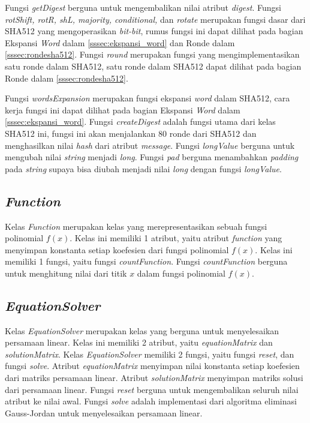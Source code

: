 Fungsi \textit{getDigest} berguna untuk mengembalikan nilai atribut \textit{digest}. Fungsi \textit{rotShift, rotR, shL, majority, conditional,} dan \textit{rotate} merupakan fungsi dasar dari SHA512 yang mengoperasikan \textit{bit-bit}, rumus fungsi ini dapat dilihat pada bagian Ekspansi \textit{Word} dalam \ref{sssec:ekspansi_word} dan Ronde dalam \ref{sssec:rondesha512}. Fungsi \textit{round} merupakan fungsi yang mengimplementasikan satu ronde dalam SHA512, satu ronde dalam SHA512 dapat dilihat pada bagian Ronde dalam \ref{sssec:rondesha512}.

Fungsi \textit{wordsExpansion} merupakan fungsi ekspansi \textit{word} dalam SHA512, cara kerja fungsi ini dapat dilihat pada bagian Ekspansi \textit{Word} dalam \ref{sssec:ekspansi_word}. Fungsi \textit{createDigest} adalah fungsi utama dari kelas SHA512 ini, fungsi ini akan menjalankan 80 ronde dari SHA512 dan menghasilkan nilai \textit{hash} dari atribut \textit{message}. Fungsi \textit{longValue} berguna untuk mengubah nilai \textit{string} menjadi \textit{long}. Fungsi \textit{pad} berguna menambahkan \textit{padding} pada \textit{string} supaya bisa diubah menjadi nilai \textit{long} dengan fungsi \textit{longValue}.

\subsection{\textit{Function}}

Kelas \textit{Function} merupakan kelas yang merepresentasikan sebuah fungsi polinomial \begin{math}f(x)\end{math}. Kelas ini memiliki 1 atribut, yaitu atribut \textit{function} yang menyimpan konstanta setiap koefesien dari fungsi polinomial \begin{math}f(x)\end{math}. Kelas ini memiliki 1 fungsi, yaitu fungsi \textit{countFunction}. Fungsi \textit{countFunction} berguna untuk menghitung nilai dari titik \begin{math}x\end{math} dalam fungsi polinomial \begin{math}f(x)\end{math}.

\subsection{\textit{EquationSolver}}

Kelas \textit{EquationSolver} merupakan kelas yang berguna untuk menyelesaikan persamaan linear. Kelas ini memiliki 2 atribut, yaitu \textit{equationMatrix} dan \textit{solutionMatrix}. Kelas \textit{EquationSolver} memiliki 2 fungsi, yaitu fungsi \textit{reset}, dan fungsi \textit{solve}. Atribut \textit{equationMatrix} menyimpan nilai konstanta setiap koefesien dari matriks persamaan linear. Atribut \textit{solutionMatrix} menyimpan matriks solusi dari persamaan linear. Fungsi \textit{reset} berguna untuk mengembalikan seluruh nilai atribut ke nilai awal. Fungsi \textit{solve} adalah implementasi dari algoritma eliminasi Gauss-Jordan untuk menyelesaikan persamaan linear.

